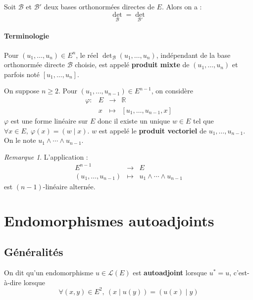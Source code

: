 \documentclass[french]{article}
\newcommand{\R}{\mathbb{R}}
\newcommand{\st}{^*}
\theoremstyle{plain}
\theoremstyle{definition}
\theoremstyle{remark}
\newtheorem*{rmq}{Remarque}
\begin{document}
\begin{thm}{}
	Soit $\mathcal{B}$ et $\mathcal{B}'$ deux bases orthonormées directes de $E$. Alors on a : $$\det_\mathcal{B}=\det_{\mathcal{B}'}$$
\end{thm}

\paragraph{Terminologie} Pour $(u_1,\ldots,u_n)\in E^n$, le réel $\det_\mathcal{B}(u_1,\ldots,u_n)$, indépendant de la base orthonormée directe $\mathcal{B}$ choisie, est appelé \textbf{produit mixte} de $(u_1,\ldots,u_n)$ et parfois noté $[u_1,\ldots,u_n]$.

\begin{dfn}
	On suppose $n\geqslant 2$. Pour $(u_1,\ldots,u_{n-1})\in E^{n-1}$, on considère $$\begin{array}{lrcl}
		\varphi:&E&\longrightarrow&\R \\
		&x&\longmapsto&[u_1,\ldots,u_{n-1},x]
	\end{array}$$ $\varphi$ est une forme linéaire sur $E$ donc il existe un unique $w\in E$ tel que $\forall x\in E,\ \varphi(x)=(w\mid x)$. $w$ est appelé le \textbf{produit vectoriel} de $u_1,\ldots,u_{n-1}$. On le note $u_1\wedge \cdots\wedge u_{n-1}$.
\end{dfn}

\begin{rmq}
	L'application : $$\begin{array}{rcl}
		E^{n-1}&\longrightarrow& E\\
		(u_1,\ldots,u_{n-1})&\longmapsto&u_1\wedge\cdots\wedge u_{n-1}
	\end{array}$$ est $(n-1)$-linéaire alternée.
\end{rmq}

\section{Endomorphismes autoadjoints}

\subsection{Généralités}

\begin{dfn}
	On dit qu'un endomorphisme $u\in\mathcal{L}(E)$ est \textbf{autoadjoint} lorsque $u\st=u$, c'est-à-dire lorsque $$\forall (x,y)\in E^2,\ (x\mid u(y))=(u(x)\mid y)$$
\end{dfn}
\end{document}
